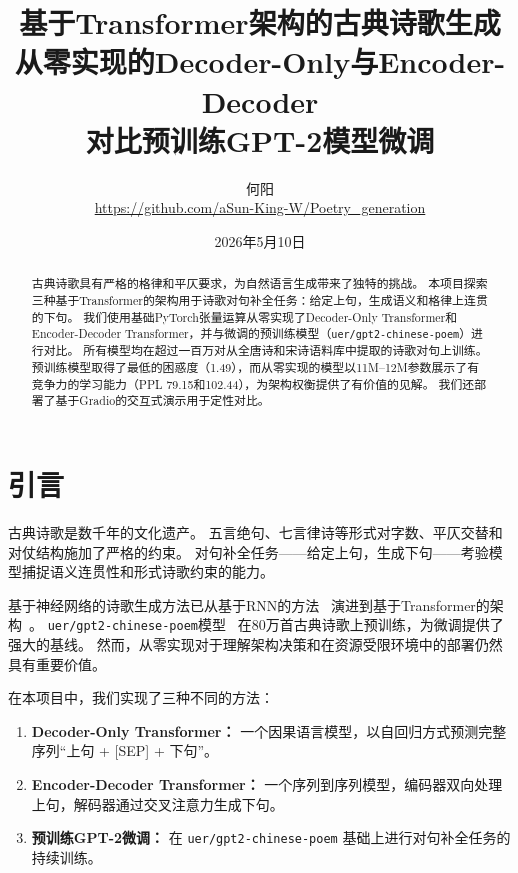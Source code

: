 \documentclass[11pt,a4paper]{article}
\title{基于Transformer架构的古典诗歌生成 \\[0.5\baselineskip]
    \large 从零实现的Decoder-Only与Encoder-Decoder \\ 对比预训练GPT-2模型微调}
\author{何阳 \\[2pt]
    \small\url{https://github.com/aSun-King-W/Poetry_generation}}
\date{2026年5月10日}
\begin{document}
\maketitle
\thispagestyle{empty}

\begin{abstract}
古典诗歌具有严格的格律和平仄要求，为自然语言生成带来了独特的挑战。
本项目探索三种基于Transformer的架构用于诗歌对句补全任务：给定上句，生成语义和格律上连贯的下句。
我们使用基础PyTorch张量运算从零实现了Decoder-Only Transformer和Encoder-Decoder Transformer，并与微调的预训练模型（\texttt{uer/gpt2-chinese-poem}）进行对比。
所有模型均在超过一百万对从全唐诗和宋诗语料库中提取的诗歌对句上训练。
预训练模型取得了最低的困惑度（1.49），而从零实现的模型以11M--12M参数展示了有竞争力的学习能力（PPL 79.15和102.44），为架构权衡提供了有价值的见解。
我们还部署了基于Gradio的交互式演示用于定性对比。
\end{abstract}

\section{引言}
\label{sec:intro}

古典诗歌是数千年的文化遗产。
五言绝句、七言律诗等形式对字数、平仄交替和对仗结构施加了严格的约束。
对句补全任务——给定上句，生成下句——考验模型捕捉语义连贯性和形式诗歌约束的能力。

基于神经网络的诗歌生成方法已从基于RNN的方法~\cite{zhang2017chinese, yi2017generating}
演进到基于Transformer的架构~\cite{vaswani2017attention}。
\texttt{uer/gpt2-chinese-poem}模型~\cite{zhao2019uer}
在80万首古典诗歌上预训练，为微调提供了强大的基线。
然而，从零实现对于理解架构决策和在资源受限环境中的部署仍然具有重要价值。

在本项目中，我们实现了三种不同的方法：
\begin{enumerate}[nosep]
    \item \textbf{Decoder-Only Transformer：}
          一个因果语言模型，以自回归方式预测完整序列“上句 + [SEP] + 下句”。
    \item \textbf{Encoder-Decoder Transformer：}
          一个序列到序列模型，编码器双向处理上句，解码器通过交叉注意力生成下句。
    \item \textbf{预训练GPT-2微调：}
          在 \texttt{uer/gpt2-chinese-poem} 基础上进行对句补全任务的持续训练。
\end{enumerate}
\end{document}
